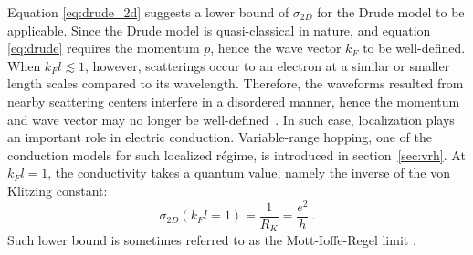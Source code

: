Equation \ref{eq:drude_2d} suggests a lower bound of $\sigma_{2D}$ for the Drude model to be applicable. Since the Drude model is quasi-classical in nature, and equation \ref{eq:drude} requires the momentum $p$, hence the wave vector $k_F$ to be well-defined. When $k_F l \lesssim 1$, however, scatterings occur to an electron at a similar or smaller length scales compared to its wavelength. Therefore, the waveforms resulted from nearby scattering centers interfere in a disordered manner, hence the momentum and wave vector may no longer be well-defined~\cite{WL_ee}. In such case, localization plays an important role in electric conduction. Variable-range hopping, one of the conduction models for such localized r\'egime, is introduced in section~\ref{sec:vrh}. At $k_F l = 1$, the conductivity takes a quantum value, namely the inverse of the von Klitzing constant:%
\begin{equation}
    \sigma_{2D}(k_F l = 1) = \frac{1}{R_K} = \frac{e^2}{h}~.
\end{equation}%
Such lower bound is sometimes referred to as the Mott-Ioffe-Regel limit \cite{mott_book, hussey2004}.